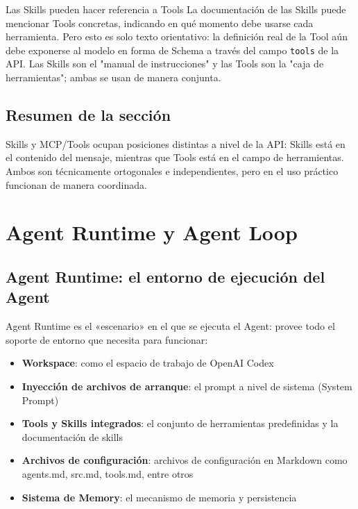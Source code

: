 \documentclass[a4paper]{article}
\begin{document}
\begin{knowledgebox}{Las Skills pueden hacer referencia a Tools}
La documentación de las Skills puede mencionar Tools concretas, indicando en qué momento debe usarse cada herramienta. Pero esto es solo texto orientativo: la definición real de la Tool aún debe exponerse al modelo en forma de Schema a través del campo \texttt{tools} de la API. Las Skills son el "manual de instrucciones" y las Tools son la "caja de herramientas"; ambas se usan de manera conjunta.
\end{knowledgebox}

\subsection{Resumen de la sección}

Skills y MCP/Tools ocupan posiciones distintas a nivel de la API: Skills está en el contenido del mensaje, mientras que Tools está en el campo de herramientas. Ambos son técnicamente ortogonales e independientes, pero en el uso práctico funcionan de manera coordinada.

\section{Agent Runtime y Agent Loop}

\subsection{Agent Runtime: el entorno de ejecución del Agent}

Agent Runtime es el «escenario» en el que se ejecuta el Agent: provee todo el soporte de entorno que necesita para funcionar:

\begin{itemize}
    \item \textbf{Workspace}: como el espacio de trabajo de OpenAI Codex
    \item \textbf{Inyección de archivos de arranque}: el prompt a nivel de sistema (System Prompt)
    \item \textbf{Tools y Skills integrados}: el conjunto de herramientas predefinidas y la documentación de skills
    \item \textbf{Archivos de configuración}: archivos de configuración en Markdown como agents.md, src.md, tools.md, entre otros
    \item \textbf{Sistema de Memory}: el mecanismo de memoria y persistencia
\end{itemize}
\end{document}
